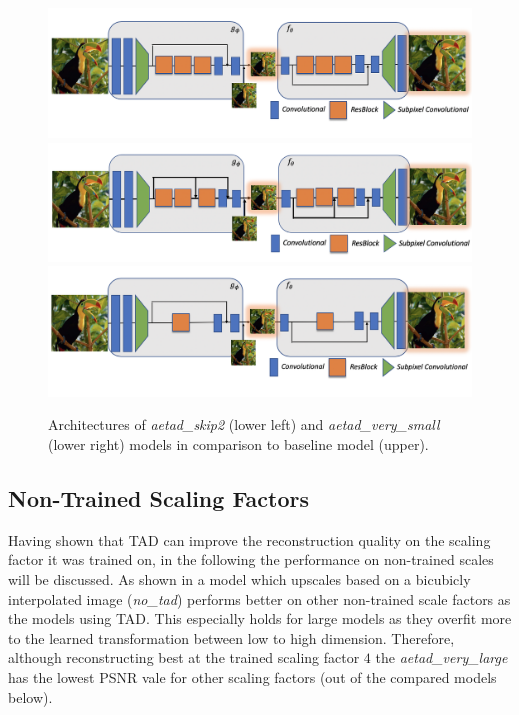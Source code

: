 \begin{figure}[!htbp]
    \centering
    \includegraphics[width=12cm]{figures/architecture_baseline.png}
    \includegraphics[width=12cm]{figures/architecture_skip2.png}
    \includegraphics[width=12cm]{figures/architecture_very_small.png}
    \caption{Architectures of \textit{aetad\_skip2} (lower left) and \textit{aetad\_very\_small} (lower right) models in comparison to baseline model (upper).}
    \label{fig:sisr_models_architecture}
\end{figure}

\subsection*{Non-Trained Scaling Factors}
Having shown that \ac{TAD} can improve the reconstruction quality on the scaling factor it was trained on, in the following the performance on non-trained scales will be discussed. As shown in  a model which upscales based on a bicubicly interpolated image (\textit{no\_tad}) performs better on other non-trained scale factors as the models using \ac{TAD}. This especially holds for large models as they overfit more to the learned transformation between low to high dimension. Therefore, although reconstructing best at the trained scaling factor $4$ the \textit{aetad\_very\_large} has the lowest \ac{PSNR} vale for other scaling factors (out of the compared models below). 

